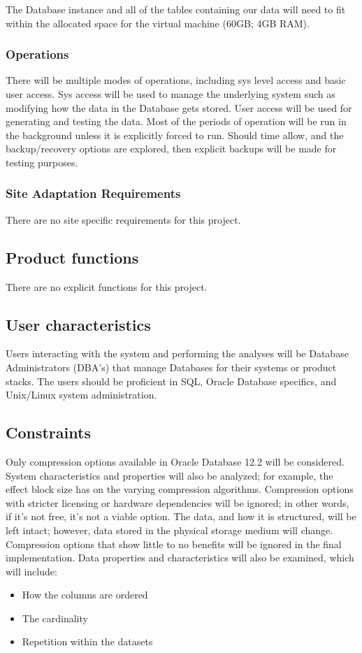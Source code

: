 \documentclass[10pt]{article}
\begin{document}
The Database instance and all of the tables containing our data will need to fit within the allocated space for the virtual machine (60GB; 4GB RAM).


\subsubsection{Operations}

There will be multiple modes of operations, including sys level access and basic user access. Sys access will be used to manage the underlying system such as modifying how the data in the Database gets stored. User access will be used for generating and testing the data. Most of the periods of operation will be run in the background unless it is explicitly forced to run. Should time allow, and the backup/recovery options are explored, then explicit backups will be made for testing purposes.


\subsubsection{Site Adaptation Requirements}

There are no site specific requirements for this project.


\subsection{Product functions}

There are no explicit functions for this project. 


\subsection{User characteristics}

Users interacting with the system and performing the analyses will be Database Administrators (DBA's) that manage Databases for their systems or product stacks. The users should be proficient in SQL, Oracle Database specifics, and Unix/Linux system administration.


\subsection{Constraints}
Only compression options available in Oracle Database 12.2 will be considered. System characteristics and properties will also be analyzed; for example, the effect block size has on the varying compression algorithms. Compression options with stricter licensing or hardware dependencies will be ignored; in other words, if it's not free, it's not a viable option. The data, and how it is structured, will be left intact; however, data stored in the physical storage medium will change. Compression options that show little to no benefits will be ignored in the final implementation.
Data properties and characteristics will also be examined, which will include:
		\begin{itemize}
			\item How the columns are ordered
			\item The cardinality
			\item Repetition within the datasets
		\end{itemize}
\end{document}
